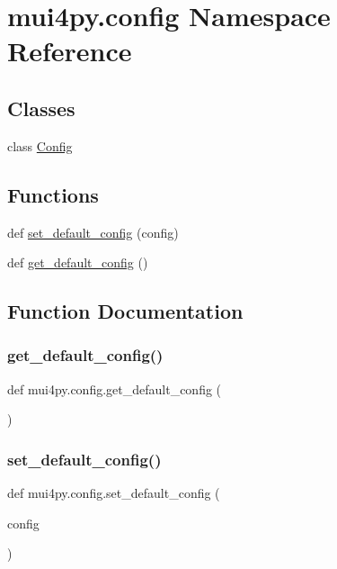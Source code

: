 \hypertarget{namespacemui4py_1_1config}{}\section{mui4py.\+config Namespace Reference}
\label{namespacemui4py_1_1config}
\subsection*{Classes}
\begin{DoxyCompactItemize}
\item 
class \hyperlink{classmui4py_1_1config_1_1_config}{Config}
\end{DoxyCompactItemize}
\subsection*{Functions}
\begin{DoxyCompactItemize}
\item 
def \hyperlink{namespacemui4py_1_1config_a209d5c50aa0a33fe2ee03bce29ef7dac}{set\+\_\+default\+\_\+config} (config)
\item 
def \hyperlink{namespacemui4py_1_1config_a55f65d6afec7fb054777757a1f26bb21}{get\+\_\+default\+\_\+config} ()
\end{DoxyCompactItemize}


\subsection{Function Documentation}
\mbox{\label{namespacemui4py_1_1config_a55f65d6afec7fb054777757a1f26bb21}} 
\subsubsection{\texorpdfstring{get\+\_\+default\+\_\+config()}{get\_default\_config()}}
{\footnotesize\ttfamily def mui4py.\+config.\+get\+\_\+default\+\_\+config (\begin{DoxyParamCaption}{ }\end{DoxyParamCaption})}

\mbox{\label{namespacemui4py_1_1config_a209d5c50aa0a33fe2ee03bce29ef7dac}} 
\subsubsection{\texorpdfstring{set\+\_\+default\+\_\+config()}{set\_default\_config()}}
{\footnotesize\ttfamily def mui4py.\+config.\+set\+\_\+default\+\_\+config (\begin{DoxyParamCaption}\item[{}]{config }\end{DoxyParamCaption})}

